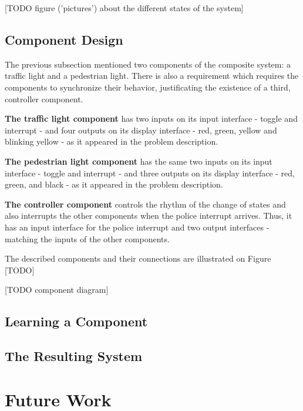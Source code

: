 [TODO figure ('pictures') about the different states of the system]

\subsection{Component Design} \label{subs_casestudycomps}

The previous subsection mentioned two components of the composite system: a traffic light and a pedestrian light. There is also a requirement which requires the components to synchronize their behavior, justificating the existence of a third, controller component. 

\textbf{The traffic light component} has two inputs on its input interface - toggle and interrupt - and four outputs on its display interface - red, green, yellow and blinking yellow - as it appeared in the problem description.

\textbf{The pedestrian light component} has the same two inputs on its input interface - toggle and interrupt - and three outputs on its display interface - red, green, and black - as it appeared in the problem description.

\textbf{The controller component} controls the rhythm of the change of states and also interrupts the other components when the police interrupt arrives. Thus, it has an input interface for the police interrupt and two output interfaces - matching the inputs of the other components.

The described components and their connections are illustrated on Figure [TODO]

[TODO component diagram]

\subsection{Learning a Component} \label{subs_casestudy}

\subsection{The Resulting System} \label{subs_casestudyresults}


\section{Future Work} \label{sec_futurework}

